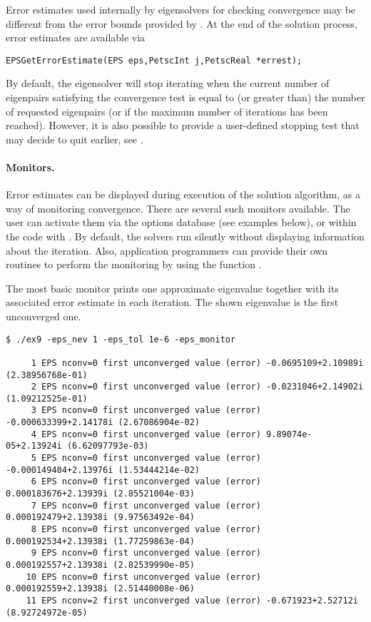 	Error estimates used internally by eigensolvers for checking convergence may be different from the error bounds provided by . At the end of the solution process, error estimates are available via
	\begin{Verbatim}[fontsize=\small]
	EPSGetErrorEstimate(EPS eps,PetscInt j,PetscReal *errest);
	\end{Verbatim}

	By default, the eigensolver will stop iterating when the current number of eigenpairs satisfying the convergence test is equal to (or greater than) the number of requested eigenpairs (or if the maximum number of iterations has been reached). However, it is also possible to provide a user-defined stopping test that may decide to quit earlier, see .

\paragraph{Monitors.}

	Error estimates can be displayed during execution of the solution algorithm, as a way of monitoring convergence. There are several such monitors available. The user can activate them via the options database (see examples below), or within the code with . By default, the solvers run silently without displaying information about the iteration. Also, application programmers can provide their own routines to perform the monitoring by using the function .

	The most basic monitor prints one approximate eigenvalue together with its associated error estimate in each iteration. The shown eigenvalue is the first unconverged one.
\begin{Verbatim}[fontsize=\footnotesize,numbers=none]
   $ ./ex9 -eps_nev 1 -eps_tol 1e-6 -eps_monitor

     1 EPS nconv=0 first unconverged value (error) -0.0695109+2.10989i (2.38956768e-01)
     2 EPS nconv=0 first unconverged value (error) -0.0231046+2.14902i (1.09212525e-01)
     3 EPS nconv=0 first unconverged value (error) -0.000633399+2.14178i (2.67086904e-02)
     4 EPS nconv=0 first unconverged value (error) 9.89074e-05+2.13924i (6.62097793e-03)
     5 EPS nconv=0 first unconverged value (error) -0.000149404+2.13976i (1.53444214e-02)
     6 EPS nconv=0 first unconverged value (error) 0.000183676+2.13939i (2.85521004e-03)
     7 EPS nconv=0 first unconverged value (error) 0.000192479+2.13938i (9.97563492e-04)
     8 EPS nconv=0 first unconverged value (error) 0.000192534+2.13938i (1.77259863e-04)
     9 EPS nconv=0 first unconverged value (error) 0.000192557+2.13938i (2.82539990e-05)
    10 EPS nconv=0 first unconverged value (error) 0.000192559+2.13938i (2.51440008e-06)
    11 EPS nconv=2 first unconverged value (error) -0.671923+2.52712i (8.92724972e-05)
\end{Verbatim}

